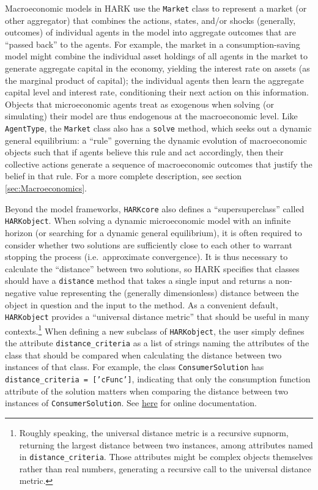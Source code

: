 \documentclass[12pt,titlepage,letterpaper]{econtex}
\begin{document}
Macroeconomic models in HARK use the \texttt{Market} class to represent a market (or other aggregator) that combines the actions, states, and/or shocks (generally, outcomes) of individual agents in the model into aggregate outcomes that are ``passed back'' to the agents.  For example, the market in a consumption-saving model might combine the individual asset holdings of all agents in the market to generate aggregate capital in the economy, yielding the interest rate on assets (as the marginal product of capital); the individual agents then learn the aggregate capital level and interest rate, conditioning their next action on this information.  Objects that microeconomic agents treat as exogenous when solving (or simulating) their model are thus endogenous at the macroeconomic level. Like \texttt{AgentType}, the \texttt{Market} class also has a \texttt{solve} method, which seeks out a dynamic general equilibrium: a ``rule'' governing the dynamic evolution of macroeconomic objects such that if agents believe this rule and act accordingly, then their collective actions generate a sequence of macroeconomic outcomes that justify the belief in that rule.  For a more complete description, see section \ref{sec:Macroeconomics}.

Beyond the model frameworks, \texttt{HARKcore} also defines a ``supersuperclass'' called \texttt{HARKobject}.  When solving a dynamic microeconomic model with an infinite horizon (or searching for a dynamic general equilibrium), it is often required to consider whether two solutions are sufficiently close to each other to warrant stopping the process (i.e.\ approximate convergence).  It is thus necessary to calculate the ``distance'' between two solutions, so HARK specifies that classes should have a \texttt{distance} method that takes a single input and returns a non-negative value representing the (generally dimensionless) distance between the object in question and the input to the method.  As a convenient default, \texttt{HARKobject} provides a ``universal distance metric'' that should be useful in many contexts.\footnote{Roughly speaking, the universal distance metric is a recursive supnorm, returning the largest distance between two instances, among attributes named in \texttt{distance\_criteria}.  Those attributes might be complex objects themselves rather than real numbers, generating a recursive call to the universal distance metric.}  When defining a new subclass of \texttt{HARKobject}, the user simply defines the attribute \texttt{distance\_criteria} as a list of strings naming the attributes of the class that should be compared when calculating the distance between two instances of that class.  For example, the class \texttt{ConsumerSolution} has \texttt{distance\_criteria = ['cFunc']}, indicating that only the consumption function attribute of the solution matters when comparing the distance between two instances of \texttt{ConsumerSolution}.  See \href{https://econ-ark.github.io/HARK/generated/HARKcore.html}{here} for online documentation.
\end{document}
